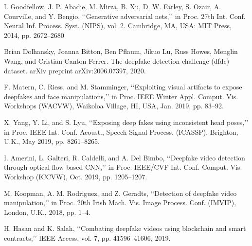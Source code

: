 \documentclass[conference]{IEEEtran}
\begin{document}
    \begin{thebibliography}{00}
    
          I. Goodfellow, J. P. Abadie, M. Mirza, B. Xu, D. W. Farley, S. Ozair, A. Courville, and Y. Bengio, ‘‘Generative adversarial nets,’’ in Proc. 27th Int. Conf. Neural Inf. Process. Syst. (NIPS), vol. 2. Cambridge, MA, USA: MIT Press, 2014, pp. 2672–2680
    
         Brian Dolhansky, Joanna Bitton, Ben Pflaum, Jikuo Lu, Russ Howes, Menglin Wang, and Cristian Canton Ferrer. The deepfake detection challenge (dfdc) dataset. arXiv preprint arXiv:2006.07397, 2020.
    
         F. Matern, C. Riess, and M. Stamminger, ‘‘Exploiting visual artifacts to expose deepfakes and face manipulations,’’ in Proc. IEEE Winter Appl. Comput. Vis. Workshops (WACVW), Waikoloa Village, HI, USA, Jan. 2019, pp. 83–92.
    
         X. Yang, Y. Li, and S. Lyu, ‘‘Exposing deep fakes using inconsistent head poses,’’ in Proc. IEEE Int. Conf. Acoust., Speech Signal Process. (ICASSP), Brighton, U.K., May 2019, pp. 8261–8265.
    
         I. Amerini, L. Galteri, R. Caldelli, and A. Del Bimbo, ‘‘Deepfake video detection through optical flow based CNN,’’ in Proc. IEEE/CVF Int. Conf. Comput. Vis. Workshop (ICCVW), Oct. 2019, pp. 1205–1207.
    
         M. Koopman, A. M. Rodriguez, and Z. Geradts, ‘‘Detection of deepfake video manipulation,’’ in Proc. 20th Irish Mach. Vis. Image Process. Conf. (IMVIP), London, U.K., 2018, pp. 1–4.
    
         H. Hasan and K. Salah, ‘‘Combating deepfake videos using blockchain and smart contracts,’’ IEEE Access, vol. 7, pp. 41596–41606, 2019.
    
    \end{thebibliography}
    
    
\end{document}
